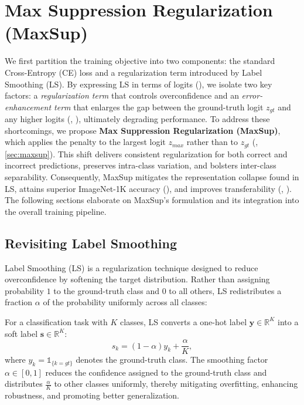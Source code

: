 \section{Max Suppression Regularization (MaxSup)}
\label{sec:method}
We first partition the training objective into two components: the standard Cross-Entropy (CE) loss and a regularization term introduced by Label Smoothing (LS). By expressing LS in terms of logits (), we isolate two key factors: a \emph{regularization term} that controls overconfidence and an \emph{error-enhancement term} that enlarges the gap between the ground-truth logit \(z_{gt}\) and any higher logits (, ), ultimately degrading performance. To address these shortcomings, we propose \textbf{Max Suppression Regularization (MaxSup)}, which applies the penalty to the largest logit \(z_{\textit{max}}\) rather than to \(z_{gt}\) (, \cref{sec:maxsup}). This shift delivers consistent regularization for both correct and incorrect predictions, preserves intra-class variation, and bolsters inter-class separability. Consequently, MaxSup mitigates the representation collapse found in LS, attains superior ImageNet-1K accuracy (), and improves transferability (, ). The following sections elaborate on MaxSup’s formulation and its integration into the overall training pipeline.


\subsection{Revisiting Label Smoothing}
\label{sec:revisiting}
Label Smoothing (LS) is a regularization technique designed to reduce overconfidence by softening the target distribution. Rather than assigning probability \(1\) to the ground-truth class and \(0\) to all others, LS redistributes a fraction \(\alpha\) of the probability uniformly across all classes:

\begin{definition}
For a classification task with \(K\) classes, LS converts a one-hot label \(\mathbf{y} \in \mathbb{R}^{K}\) into a soft label \(\mathbf{s} \in \mathbb{R}^{K}\):
\begin{equation}
s_k = (1 - \alpha) y_k + \frac{\alpha}{K},
\end{equation}
where \(y_k = \mathds{1}_{\{k = gt\}}\) denotes the ground-truth class. The smoothing factor \(\alpha \in [0,1]\) reduces the confidence assigned to the ground-truth class and distributes \(\tfrac{\alpha}{K}\) to other classes uniformly, thereby mitigating overfitting, enhancing robustness, and promoting better generalization.
\end{definition}

